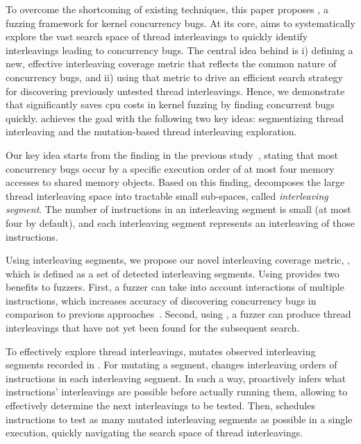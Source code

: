 To overcome the shortcoming of existing techniques, this paper proposes
\sys, a fuzzing framework for kernel concurrency bugs. 
At its core, \sys aims to systematically explore the vast search space of thread
interleavings to quickly identify
interleavings leading to concurrency bugs. The central idea behind \sys
is i) defining a new, effective interleaving coverage metric that reflects the 
common nature of concurrency bugs, and ii) using that metric to drive 
an efficient search strategy for discovering previously untested thread interleavings.
Hence, we demonstrate that \sys significantly saves cpu costs
in kernel fuzzing by finding concurrent bugs quickly.
\sys achieves the goal with the following two key ideas:
segmentizing thread interleaving and the mutation-based thread interleaving exploration.

%
Our key idea starts from the finding in the previous
study~\cite{learningfrommistakes}, stating that most concurrency bugs
occur by a specific execution order of at most four memory accesses to
shared memory objects.
%
Based on this finding, \sys decomposes the large thread interleaving
space into tractable small sub-spaces, called \textit{interleaving
  segment}. The number of instructions in an interleaving segment is
small (at most four by default), and each interleaving segment
represents an interleaving of those instructions.

Using interleaving segments, we propose our novel interleaving
coverage metric, \textit{\intcov}, which is defined as a set of
detected interleaving segments.
%
Using \intcov provides two benefits to fuzzers. First, a fuzzer can
take into account interactions of multiple instructions, which
increases accuracy of discovering concurrency bugs in comparison to
previous approaches~\cite{krace, conzzer}.  Second, using \intcov, a
fuzzer can produce thread interleavings that have not yet been found
for the subsequent search.

%
To effectively explore thread interleavings, \sys mutates observed
interleaving segments recorded in \intcov. For mutating a segment,
\sys changes interleaving orders of instructions in each
interleaving segment.
%
In such a way, \sys proactively infers what instructions'
interleavings are possible before actually running them, allowing \sys
to effectively determine the next interleavings to be tested.
%
Then, \sys schedules instructions to test as many mutated interleaving
segments as possible in a single execution, quickly navigating the search space of thread interleavings.

